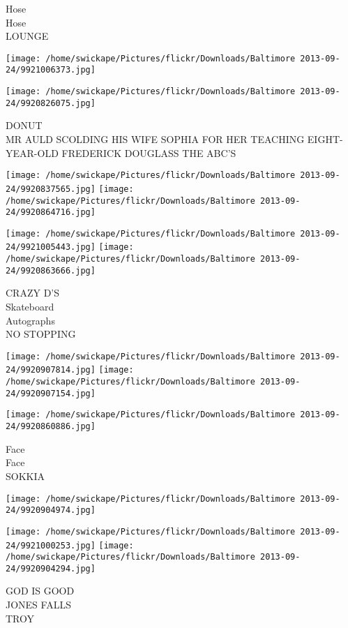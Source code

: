 \documentclass[10pt,letterpaper]{article}
\begin{document}
Hose\\
Hose\\
LOUNGE
\pagebreak

\texttt{[image: /home/swickape/Pictures/flickr/Downloads/Baltimore 2013-09-24/9921006373.jpg]}

\vspace{0.25in}
\texttt{[image: /home/swickape/Pictures/flickr/Downloads/Baltimore 2013-09-24/9920826075.jpg]}

DONUT\\
MR AULD SCOLDING HIS WIFE SOPHIA FOR HER TEACHING EIGHT{-}YEAR{-}OLD FREDERICK DOUGLASS THE ABC'S
\pagebreak

\texttt{[image: /home/swickape/Pictures/flickr/Downloads/Baltimore 2013-09-24/9920837565.jpg]}
\texttt{[image: /home/swickape/Pictures/flickr/Downloads/Baltimore 2013-09-24/9920864716.jpg]}

\texttt{[image: /home/swickape/Pictures/flickr/Downloads/Baltimore 2013-09-24/9921005443.jpg]}
\texttt{[image: /home/swickape/Pictures/flickr/Downloads/Baltimore 2013-09-24/9920863666.jpg]}

CRAZY D'S\\
Skateboard\\
Autographs\\
NO STOPPING
\pagebreak

\texttt{[image: /home/swickape/Pictures/flickr/Downloads/Baltimore 2013-09-24/9920907814.jpg]}
\texttt{[image: /home/swickape/Pictures/flickr/Downloads/Baltimore 2013-09-24/9920907154.jpg]}

\texttt{[image: /home/swickape/Pictures/flickr/Downloads/Baltimore 2013-09-24/9920860886.jpg]}

Face\\
Face\\
SOKKIA
\pagebreak

\texttt{[image: /home/swickape/Pictures/flickr/Downloads/Baltimore 2013-09-24/9920904974.jpg]}

\vspace{0.25in}
\texttt{[image: /home/swickape/Pictures/flickr/Downloads/Baltimore 2013-09-24/9921000253.jpg]}
\texttt{[image: /home/swickape/Pictures/flickr/Downloads/Baltimore 2013-09-24/9920904294.jpg]}

GOD IS GOOD\\
JONES FALLS\\
TROY
\pagebreak
\end{document}

